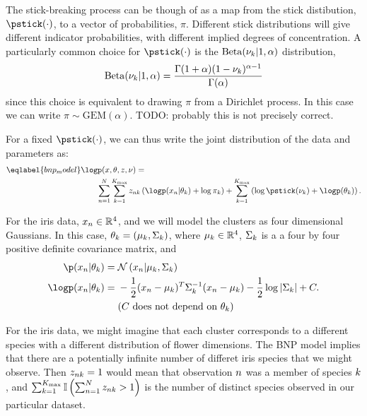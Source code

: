 The stick-breaking process can be though of as a map from  the stick
distibution, $\pstick(\cdot)$, to a vector of probabilities, $\pi$. Different
stick distributions will give different indicator probabilities, with different
implied degrees of concentration.  A particularly common choice for
$\pstick(\cdot)$ is the $\mathrm{Beta}(\nu_{k} \vert 1, \alpha)$ distribution,
%
\begin{align*}
%
\mathrm{Beta}(\nuk \vert 1, \alpha) =
    \frac{\Gamma(1 + \alpha) (1 - \nuk)^{\alpha - 1}}
         {\Gamma(\alpha)}
%
\end{align*}
%
since this choice is equivalent to drawing $\pi$ from a Dirichlet process.
In this case we can write $\pi \sim \mathrm{GEM}(\alpha)$.  TODO: probably
this is not precisely correct.

For a fixed $\pstick(\cdot)$, we can thus write the joint distribution of
the data and parameters as:
%
\begin{align}\eqlabel{bnp_model}
%
\MoveEqLeft
\logp(\x, \theta, \z, \nu) ={}
\nonumber\\&
    \sum_{n=1}^N \sum_{k=1}^{\kmax}
        \z_{\n\k} \left(
            \logp(\x_n \vert \theta_\k) + \log \pi_\k
        \right) +
    \sum_{k=1}^{\kmax} \left(
        \log \pstick(\nuk) + \logp(\theta_\k)
    \right).
%
\end{align}
%

\begin{ex}
%
For the iris data, $x_n \in \mathbb{R}^4$, and we will model the clusters as
four dimensional Gaussians.  In this case, $\theta_k = (\mu_k, \Sigma_k)$,
where $\mu_k \in \mathbb{R}^4$, $\Sigma_k$ is a a four by four positive
definite covariance matrix, and
%
\begin{align*}
%
\p(\x_\n \vert \theta_\k) ={}& \normdist{\x_n \vert \mu_\k, \Sigma_\k} \\
\logp(\x_\n \vert \theta_\k) ={}&
    -\frac{1}{2}(\x_n - \mu_k)^T \Sigma_\k^{-1} (\x_n - \mu_k)
    -\frac{1}{2} \log |\Sigma_\k| + \const.\\
    & \constdesc{\theta_\k}
%
\end{align*}

For the iris data, we might imagine that each cluster corresponds to a different
species with a different distribution of flower dimensions.  The BNP model
implies that there are a potentially infinite number of differet iris species
that we might observe.  Then $z_{nk} = 1$ would mean that observation $n$
was a member of species $k$, and $\sum_{k=1}^{K_{\mathrm{max}}} \mathbb{I}\left( \sum_{n=1}^{N}
z_{nk} > 1\right)$ is the number of distinct species observed in our particular
dataset.
%
\end{ex}
